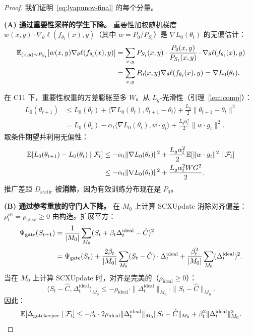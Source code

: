 \begin{proof}
我们证明~\eqref{eq:lyapunov-final} 的每个分量。

\textbf{(A) 通过重要性采样的学生下降。} 重要性加权随机梯度 $w(x,y) \cdot \nabla_\theta \ell(f_{\theta_t}(x), y)$（其中 $w = P_0/P_{S_t}$）是 $\nabla L_0(\theta_t)$ 的无偏估计：
\begin{align}
    \mathbb{E}_{(x,y) \sim P_{S_t}}[w(x,y) \nabla_\theta \ell(f_{\theta_t}(x), y)]
    &= \sum_{x,y} P_{S_t}(x,y) \cdot \frac{P_0(x,y)}{P_{S_t}(x,y)} \cdot \nabla_\theta \ell(f_{\theta_t}(x), y) \notag\\
    &= \sum_{x,y} P_0(x,y) \nabla_\theta \ell(f_{\theta_t}(x), y) = \nabla L_0(\theta_t).
\end{align}

在 C11 下，重要性权重的方差膨胀至多 $W$。从 $L_g$-光滑性（引理~\ref{lem:comp}）：
\begin{align}
    L_0(\theta_{t+1}) &\leq L_0(\theta_t) + \langle \nabla L_0(\theta_t), \theta_{t+1} - \theta_t \rangle + \frac{L_g}{2}\|\theta_{t+1} - \theta_t\|^2 \\
    &= L_0(\theta_t) - \alpha_t \langle \nabla L_0(\theta_t), w \cdot g_t \rangle + \frac{L_g \alpha_t^2}{2} \|w \cdot g_t\|^2.
\end{align}
取条件期望并利用无偏性：
\begin{align}
    \mathbb{E}[L_0(\theta_{t+1}) - L_0(\theta_t) \mid \mathcal{F}_t]
    &\leq -\alpha_t \|\nabla L_0(\theta_t)\|^2 + \frac{L_g \alpha_t^2}{2} \mathbb{E}[\|w \cdot g_t\|^2 \mid \mathcal{F}_t] \notag\\
    &\leq -\alpha_t \|\nabla L_0(\theta_t)\|^2 + \frac{L_g \alpha_t^2 W G^2}{2}.
\end{align}
推广差距 $D_{\text{static}}$ 被\textbf{消除}，因为有效训练分布现在是 $P_0$。

\textbf{(B) 通过参考重放的守门人下降。} 在 $M_0$ 上计算 SCXUpdate 消除对齐偏差：$\rho_t^{\text{eff}} = \rho_{\text{ideal}} \geq 0$ 由构造。扩展平方：
\begin{align}
    \Psi_{\text{gate}}(S_{t+1}) &= \frac{1}{|M_0|} \sum_{M_0} (S_t + \beta_t \Delta_t^{\text{ideal}} - \hat{C})^2 \notag\\
    &= \Psi_{\text{gate}}(S_t) + \frac{2\beta_t}{|M_0|} \sum_{M_0} (S_t - \hat{C}) \cdot \Delta_t^{\text{ideal}} + \frac{\beta_t^2}{|M_0|} \sum_{M_0} (\Delta_t^{\text{ideal}})^2.
\end{align}
当在 $M_0$ 上计算 SCXUpdate 时，对齐是完美的（$\rho_{\text{ideal}} \geq 0$）：
\begin{equation}
    \langle S_t - \hat{C}, \Delta_t^{\text{ideal}} \rangle_{M_0} \leq -\rho_{\text{ideal}} \cdot \|\Delta_t^{\text{ideal}}\|_{M_0} \cdot \|S_t - \hat{C}\|_{M_0}.
\end{equation}
因此：
\begin{equation}
    \mathbb{E}[\Delta_{\text{gatekeeper}} \mid \mathcal{F}_t] \leq -\beta_t \cdot 2\rho_{\text{ideal}} \|\Delta_t^{\text{ideal}}\|_{M_0} \|S_t - \hat{C}\|_{M_0} + \beta_t^2 \|\Delta_t^{\text{ideal}}\|_{M_0}^2.
\end{equation}


\end{proof}
